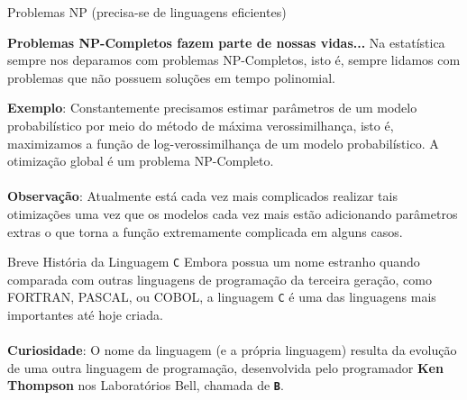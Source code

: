 \documentclass{beamer}
\newcommand{\C}{\texttt{C}}
\begin{document}
\begin{frame}{Problemas NP (precisa-se de linguagens eficientes)}
\begin{block}{\textbf{Problemas NP-Completos fazem parte de nossas vidas...}}
Na estatística sempre nos deparamos com problemas NP-Completos, isto é, sempre lidamos com problemas que não possuem soluções em tempo polinomial.
\end{block}
\vspace{0.3cm}
\textbf{Exemplo}: Constantemente precisamos estimar parâmetros de um modelo probabilístico por meio do método de máxima verossimilhança, isto é, maximizamos a função de log-verossimilhança de um modelo probabilístico. A otimização global é um problema NP-Completo.\\~\\

\textbf{Observação}: Atualmente está cada vez mais complicados realizar tais otimizações uma vez que os modelos cada vez mais estão adicionando parâmetros extras o que torna a função extremamente complicada em alguns casos.


\end{frame}

\begin{frame}{Breve História da Linguagem \texttt{C}}
Embora possua um nome estranho quando comparada com outras linguagens de programação da terceira geração, como FORTRAN, PASCAL, ou COBOL, a linguagem \texttt{C} é uma das linguagens mais importantes até hoje criada.\\~\\

\textbf{Curiosidade}: O nome da linguagem (e a própria linguagem) resulta da evolução de uma outra linguagem de programação, desenvolvida pelo programador \textbf{Ken Thompson} nos Laboratórios Bell, chamada de \textbf{\texttt{B}}.
\end{frame}

\end{document}
